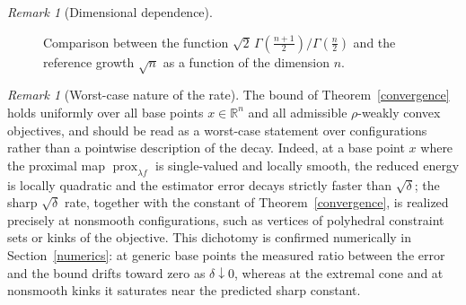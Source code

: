 \documentclass[11pt]{article}
\newcommand{\1}{\mathds{1}}
\theoremstyle{definition}
\theoremstyle{remark}
\newtheorem{remark}[theorem]{Remark}
\theoremstyle{definition}
\begin{document}
\begin{remark}[Dimensional dependence]
\begin{figure}[htbp]
\caption{Comparison between the function
$\sqrt{2}\,\Gamma\!\left(\frac{n+1}{2}\right)/\Gamma\!\left(\frac{n}{2}\right)$
and the reference growth $\sqrt{n}$ as a function of the dimension $n$.}
\label{fig:gamma-ratio-vs-sqrtn}
\end{figure}
\end{remark}
\begin{remark}[Worst-case nature of the rate]
The bound of Theorem~\ref{convergence} holds uniformly over all base
points \(x\in\mathbb{R}^n\) and all admissible \(\rho\)-weakly convex
objectives, and should be read as a worst-case statement over
configurations rather than a pointwise description of the decay. Indeed,
at a base point \(x\) where the proximal map \(\operatorname{prox}_{\lambda
f}\) is single-valued and locally smooth, the reduced energy is locally
quadratic and the estimator error decays strictly faster than
\(\sqrt{\delta}\); the sharp \(\sqrt{\delta}\) rate, together with the
constant of Theorem~\ref{convergence}, is realized precisely at nonsmooth
configurations, such as vertices of polyhedral constraint sets or kinks of
the objective. This dichotomy is confirmed numerically in
Section~\ref{numerics}: at generic base points the measured ratio between
the error and the bound drifts toward zero as \(\delta\downarrow 0\),
whereas at the extremal cone and at nonsmooth kinks it saturates near the
predicted sharp constant.
\end{remark}
\end{document}
